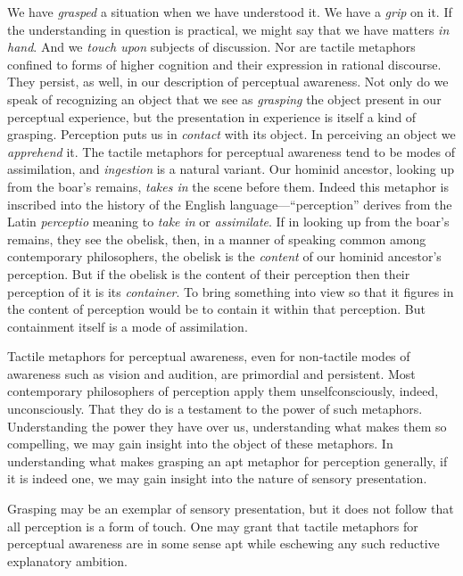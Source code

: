 \documentclass[12pt]{article}
\begin{document}
We have \emph{grasped} a situation when we have understood it. We have a \emph{grip} on it. If the understanding in question is practical, we might say that we have matters \emph{in hand}. And we \emph{touch upon} subjects of discussion. Nor are tactile metaphors confined to forms of higher cognition and their expression in rational discourse. They persist, as well, in our description of perceptual awareness. Not only do we speak of recognizing an object that we see as \emph{grasping} the object present in our perceptual experience, but the presentation in experience is itself a kind of grasping. Perception puts us in \emph{contact} with its object. In perceiving an object we \emph{apprehend} it. The tactile metaphors for perceptual awareness tend to be modes of assimilation, and \emph{ingestion} is a natural variant. Our hominid ancestor, looking up from the boar's remains, \emph{takes in} the scene before them. Indeed this metaphor is inscribed into the history of the English language---``perception'' derives from the Latin \emph{perceptio} meaning to \emph{take in} or \emph{assimilate}. If in looking up from the boar's remains, they see the obelisk, then, in a manner of speaking common among contemporary philosophers, the obelisk is the \emph{content} of our hominid ancestor's perception. But if the obelisk is the content of their perception then their perception of it is its \emph{container}. To bring something into view so that it figures in the content of perception would be to contain it within that perception. But containment itself is a mode of assimilation. 

Tactile metaphors for perceptual awareness, even for non-tactile modes of awareness such as vision and audition, are primordial and persistent. Most contemporary philosophers of perception apply them unselfconsciously, indeed, unconsciously. That they do is a testament to the power of such metaphors. Understanding the power they have over us, understanding what makes them so compelling, we may gain insight into the object of these metaphors. In understanding what makes grasping an apt metaphor for perception generally, if it is indeed one, we may gain insight into the nature of sensory presentation.

Grasping may be an exemplar of sensory presentation, but it does not follow that all perception is a form of touch. One may grant that tactile metaphors for perceptual awareness are in some sense apt while eschewing any such reductive explanatory ambition.
\end{document}
